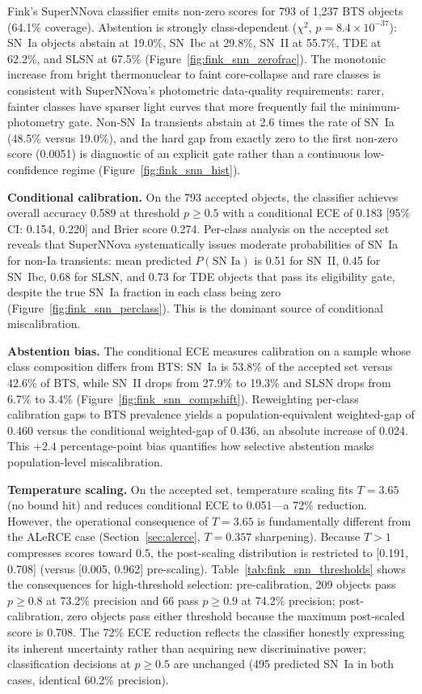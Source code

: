 \documentclass[twocolumn]{aastex631}
\begin{document}
Fink's SuperNNova classifier \citep{moller2020} emits non-zero scores for 793 of 1,237 BTS objects (64.1\% coverage). Abstention is strongly class-dependent ($\chi^2$, $p = 8.4 \times 10^{-37}$): SN~Ia objects abstain at 19.0\%, SN~Ibc at 29.8\%, SN~II at 55.7\%, TDE at 62.2\%, and SLSN at 67.5\% (Figure~\ref{fig:fink_snn_zerofrac}). The monotonic increase from bright thermonuclear to faint core-collapse and rare classes is consistent with SuperNNova's photometric data-quality requirements: rarer, fainter classes have sparser light curves that more frequently fail the minimum-photometry gate. Non-SN~Ia transients abstain at 2.6 times the rate of SN~Ia (48.5\% versus 19.0\%), and the hard gap from exactly zero to the first non-zero score (0.0051) is diagnostic of an explicit gate rather than a continuous low-confidence regime (Figure~\ref{fig:fink_snn_hist}).

\textbf{Conditional calibration.} On the 793 accepted objects, the classifier achieves overall accuracy 0.589 at threshold $p \ge 0.5$ with a conditional ECE of 0.183 [95\% CI: 0.154, 0.220] and Brier score 0.274. Per-class analysis on the accepted set reveals that SuperNNova systematically issues moderate probabilities of SN~Ia for non-Ia transients: mean predicted $P(\text{SN~Ia})$ is 0.51 for SN~II, 0.45 for SN~Ibc, 0.68 for SLSN, and 0.73 for TDE objects that pass its eligibility gate, despite the true SN~Ia fraction in each class being zero (Figure~\ref{fig:fink_snn_perclass}). This is the dominant source of conditional miscalibration.

\textbf{Abstention bias.} The conditional ECE measures calibration on a sample whose class composition differs from BTS: SN~Ia is 53.8\% of the accepted set versus 42.6\% of BTS, while SN~II drops from 27.9\% to 19.3\% and SLSN drops from 6.7\% to 3.4\% (Figure~\ref{fig:fink_snn_compshift}). Reweighting per-class calibration gaps to BTS prevalence yields a population-equivalent weighted-gap of 0.460 versus the conditional weighted-gap of 0.436, an absolute increase of 0.024. This $+2.4$ percentage-point bias quantifies how selective abstention masks population-level miscalibration.

\textbf{Temperature scaling.} On the accepted set, temperature scaling fits $T = 3.65$ (no bound hit) and reduces conditional ECE to 0.051---a 72\% reduction. However, the operational consequence of $T = 3.65$ is fundamentally different from the ALeRCE case (Section~\ref{sec:alerce}, $T = 0.357$ sharpening). Because $T > 1$ compresses scores toward 0.5, the post-scaling distribution is restricted to [0.191, 0.708] (versus [0.005, 0.962] pre-scaling). Table~\ref{tab:fink_snn_thresholds} shows the consequences for high-threshold selection: pre-calibration, 209 objects pass $p \ge 0.8$ at 73.2\% precision and 66 pass $p \ge 0.9$ at 74.2\% precision; post-calibration, zero objects pass either threshold because the maximum post-scaled score is 0.708. The 72\% ECE reduction reflects the classifier honestly expressing its inherent uncertainty rather than acquiring new discriminative power; classification decisions at $p \ge 0.5$ are unchanged (495 predicted SN~Ia in both cases, identical 60.2\% precision).
\end{document}
